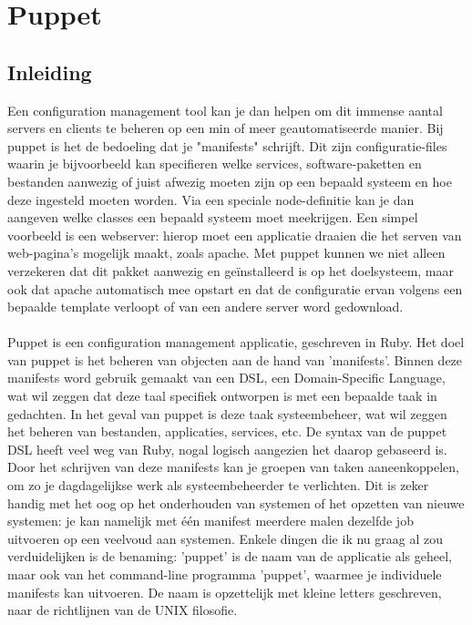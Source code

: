 \chapter{Puppet}

\section{Inleiding}
Een configuration management tool kan je dan helpen om dit immense aantal servers en clients te beheren op een min of meer geautomatiseerde manier. Bij puppet is het de bedoeling dat je "manifests" schrijft. Dit zijn configuratie-files waarin je bijvoorbeeld kan specifieren welke services, software-paketten en bestanden aanwezig of juist afwezig moeten zijn op een bepaald systeem en hoe deze ingesteld moeten worden. Via een speciale node-definitie kan je dan aangeven welke classes een bepaald systeem moet meekrijgen. Een simpel voorbeeld is een webserver: hierop moet een applicatie draaien die het serven van web-pagina's mogelijk maakt, zoals apache. Met puppet kunnen we niet alleen verzekeren dat dit pakket aanwezig en ge\"installeerd is op het doelsysteem, maar ook dat apache automatisch mee opstart en dat de configuratie ervan volgens een bepaalde template verloopt of van een andere server word gedownload.\\\\
%
Puppet is een configuration management applicatie, geschreven in Ruby. Het doel van puppet is het beheren van objecten aan de hand van 'manifests'. Binnen deze manifests word gebruik gemaakt van een DSL, een Domain-Specific Language, wat wil zeggen dat deze taal specifiek ontworpen is met een bepaalde taak in gedachten. In het geval van puppet is deze taak systeembeheer, wat wil zeggen het beheren van bestanden, applicaties, services, etc. De syntax van de puppet DSL heeft veel weg van Ruby, nogal logisch aangezien het daarop gebaseerd is. Door het schrijven van deze manifests kan je groepen van taken aaneenkoppelen, om zo je dagdagelijkse werk als systeembeheerder te verlichten. Dit is zeker handig met het oog op het onderhouden van systemen of het opzetten van nieuwe systemen: je kan namelijk met \'e\'en manifest meerdere malen dezelfde job uitvoeren op een veelvoud aan systemen. Enkele dingen die ik nu graag al zou verduidelijken is de benaming: 'puppet' is de naam van de applicatie als geheel, maar ook van het command-line programma 'puppet', waarmee je individuele manifests kan uitvoeren. De naam is opzettelijk met kleine letters geschreven, naar de richtlijnen van de UNIX filosofie.


